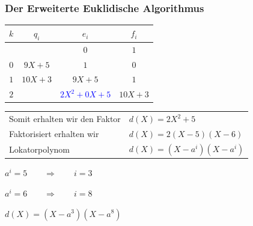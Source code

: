 \documentclass[11pt,aspectratio=169]{beamer}
\begin{document}
	\begin{frame}
		\frametitle{Der Erweiterte Euklidische Algorithmus}
		
		\begin{center}
			
		\begin{tabular}{| c | c | c c |}
			\hline
			$k$ &  $q_i$ & $e_i$ & $f_i$\\
			\hline 
			& & $0$& $1$\\
			$0$& $9X + 5$& $1$& $0$\\
			$1$& $10X + 3$& $9X+5$& $1$\\
			$2$& & \textcolor{blue}{$2X^2 + 0X + 5$}& $10X + 3$\\
			\hline
		\end{tabular}	
			
		\end{center}
		
		\vspace{10pt}
		
		\begin{tabular}{ll}
			Somit erhalten wir den Faktor& $d(X) = 2X^2 + 5$\\
			Faktorisiert erhalten wir& $d(X) = 2(X-5)(X-6)$\\
			Lokatorpolynom& $d(X) = (X-a^i)(X-a^i)$
		\end{tabular}
		
		\vspace{10pt}
		
		\begin{center}
			$a^i = 5 \qquad \Rightarrow \qquad i = 3$
			
			$a^i = 6 \qquad \Rightarrow \qquad i = 8$
		\end{center}
		

	$d(X) = (X-a^3)(X-a^8)$
		
	\end{frame}
\end{document}

